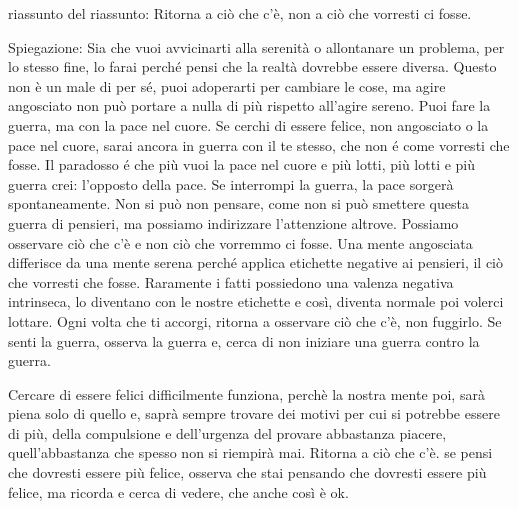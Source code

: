 \documentclass[12pt]{book} %
\begin{document}
\begin{mdframed}[linewidth=1pt]
riassunto del riassunto: Ritorna a ciò che c'è, non a ciò che vorresti ci fosse.

Spiegazione: Sia che vuoi avvicinarti alla serenità o allontanare un problema, per lo stesso fine, lo farai perché pensi che la realtà dovrebbe essere diversa. Questo non è un male di per sé, puoi adoperarti per cambiare le cose, ma agire angosciato non può portare a nulla di più rispetto all'agire sereno. Puoi fare la guerra, ma con la pace nel cuore. Se cerchi di essere felice, non angosciato o la pace nel cuore, sarai ancora in guerra con il te stesso, che non é come vorresti che fosse. Il paradosso é che più vuoi la pace nel cuore e più lotti, più lotti e più guerra crei: l'opposto della pace. Se interrompi la guerra, la pace sorgerà spontaneamente. Non si può non pensare, come non si può smettere questa guerra di pensieri, ma possiamo indirizzare l'attenzione altrove. Possiamo osservare ciò che c'è e non ciò che vorremmo ci fosse. Una mente angosciata differisce da una mente serena perché applica etichette negative ai pensieri, il ciò che vorresti che fosse. Raramente i fatti possiedono una valenza negativa intrinseca, lo diventano con le nostre etichette e così, diventa normale poi volerci lottare. Ogni volta che ti accorgi, ritorna a osservare ciò che c'è, non fuggirlo. Se senti la guerra, osserva la guerra e, cerca di non iniziare una guerra contro la guerra.

Cercare di essere felici difficilmente funziona, perchè la nostra mente poi, sarà piena solo di quello e, saprà sempre trovare dei motivi per cui si potrebbe essere di più, della compulsione e dell'urgenza del provare abbastanza piacere, quell'abbastanza che spesso non si riempirà mai. Ritorna a ciò che c'è. se pensi che dovresti essere più felice, osserva che stai pensando che dovresti essere più felice, ma ricorda e cerca di vedere, che anche così è ok.


\end{mdframed}
\end{document}
